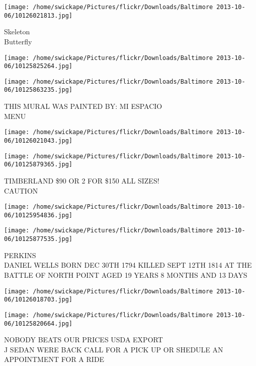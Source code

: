 \documentclass[10pt,letterpaper]{article}
\begin{document}
\vspace{0.25in}
\texttt{[image: /home/swickape/Pictures/flickr/Downloads/Baltimore 2013-10-06/10126021813.jpg]}

Skeleton\\
Butterfly\\
\pagebreak

\texttt{[image: /home/swickape/Pictures/flickr/Downloads/Baltimore 2013-10-06/10125825264.jpg]}

\vspace{0.25in}
\texttt{[image: /home/swickape/Pictures/flickr/Downloads/Baltimore 2013-10-06/10125863235.jpg]}

THIS MURAL WAS PAINTED BY: MI ESPACIO\\
MENU\\
\pagebreak

\texttt{[image: /home/swickape/Pictures/flickr/Downloads/Baltimore 2013-10-06/10126021043.jpg]}

\vspace{0.25in}
\texttt{[image: /home/swickape/Pictures/flickr/Downloads/Baltimore 2013-10-06/10125879365.jpg]}

TIMBERLAND \$90 OR 2 FOR \$150 ALL SIZES!\\
CAUTION\\
\pagebreak

\texttt{[image: /home/swickape/Pictures/flickr/Downloads/Baltimore 2013-10-06/10125954836.jpg]}

\vspace{0.25in}
\texttt{[image: /home/swickape/Pictures/flickr/Downloads/Baltimore 2013-10-06/10125877535.jpg]}

PERKINS\\
DANIEL WELLS BORN DEC 30TH 1794 KILLED SEPT 12TH 1814 AT THE BATTLE OF NORTH POINT AGED 19 YEARS 8 MONTHS AND 13 DAYS\\
\pagebreak

\texttt{[image: /home/swickape/Pictures/flickr/Downloads/Baltimore 2013-10-06/10126018703.jpg]}

\vspace{0.25in}
\texttt{[image: /home/swickape/Pictures/flickr/Downloads/Baltimore 2013-10-06/10125820664.jpg]}

NOBODY BEATS OUR PRICES USDA EXPORT\\
J SEDAN WERE BACK CALL FOR A PICK UP OR SHEDULE AN APPOINTMENT FOR A RIDE\\
\pagebreak
\end{document}
